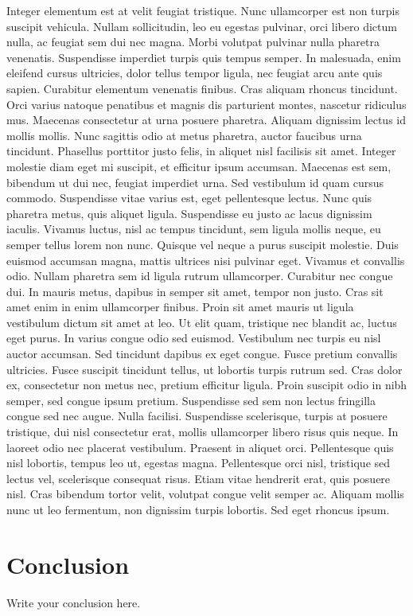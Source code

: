 \documentclass{article}
\begin{document}
Integer elementum est at velit feugiat tristique. Nunc ullamcorper est non turpis suscipit vehicula. Nullam sollicitudin, leo eu egestas pulvinar, orci libero dictum nulla, ac feugiat sem dui nec magna. Morbi volutpat pulvinar nulla pharetra venenatis. Suspendisse imperdiet turpis quis tempus semper. In malesuada, enim eleifend cursus ultricies, dolor tellus tempor ligula, nec feugiat arcu ante quis sapien. Curabitur elementum venenatis finibus. Cras aliquam rhoncus tincidunt. Orci varius natoque penatibus et magnis dis parturient montes, nascetur ridiculus mus. Maecenas consectetur at urna posuere pharetra. Aliquam dignissim lectus id mollis mollis. Nunc sagittis odio at metus pharetra, auctor faucibus urna tincidunt. Phasellus porttitor justo felis, in aliquet nisl facilisis sit amet. Integer molestie diam eget mi suscipit, et efficitur ipsum accumsan. Maecenas est sem, bibendum ut dui nec, feugiat imperdiet urna.
Sed vestibulum id quam cursus commodo. Suspendisse vitae varius est, eget pellentesque lectus. Nunc quis pharetra metus, quis aliquet ligula. Suspendisse eu justo ac lacus dignissim iaculis. Vivamus luctus, nisl ac tempus tincidunt, sem ligula mollis neque, eu semper tellus lorem non nunc. Quisque vel neque a purus suscipit molestie. Duis euismod accumsan magna, mattis ultrices nisi pulvinar eget. Vivamus et convallis odio. Nullam pharetra sem id ligula rutrum ullamcorper. Curabitur nec congue dui. In mauris metus, dapibus in semper sit amet, tempor non justo. Cras sit amet enim in enim ullamcorper finibus. Proin sit amet mauris ut ligula vestibulum dictum sit amet at leo. Ut elit quam, tristique nec blandit ac, luctus eget purus. In varius congue odio sed euismod. Vestibulum nec turpis eu nisl auctor accumsan.
Sed tincidunt dapibus ex eget congue. Fusce pretium convallis ultricies. Fusce suscipit tincidunt tellus, ut lobortis turpis rutrum sed. Cras dolor ex, consectetur non metus nec, pretium efficitur ligula. Proin suscipit odio in nibh semper, sed congue ipsum pretium. Suspendisse sed sem non lectus fringilla congue sed nec augue. Nulla facilisi. Suspendisse scelerisque, turpis at posuere tristique, dui nisl consectetur erat, mollis ullamcorper libero risus quis neque. In laoreet odio nec placerat vestibulum. Praesent in aliquet orci. Pellentesque quis nisl lobortis, tempus leo ut, egestas magna. Pellentesque orci nisl, tristique sed lectus vel, scelerisque consequat risus. Etiam vitae hendrerit erat, quis posuere nisl. Cras bibendum tortor velit, volutpat congue velit semper ac. Aliquam mollis nunc ut leo fermentum, non dignissim turpis lobortis. Sed eget rhoncus ipsum.

\section{Conclusion}
Write your conclusion here.
\end{document}

